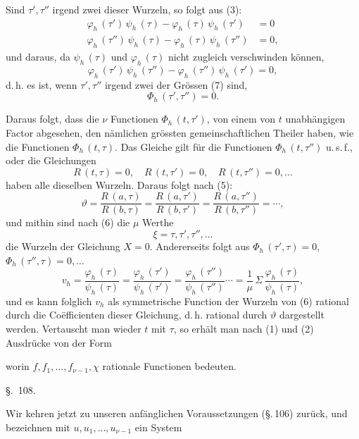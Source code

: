 Sind $\tau', \tau''$ irgend zwei dieser Wurzeln, so folgt aus (3):
\[
\begin{aligned}
\varphi_h\,(\tau')\,\psi_h\,(\tau) - \varphi_h\,(\tau)\,\psi_h\,(\tau') &= 0\\
\varphi_h\,(\tau'')\,\psi_h\,(\tau) - \varphi_h\,(\tau)\,\psi_h\,(\tau'') &= 0,
\end{aligned}
\]
und daraus, da $\psi_h\,(\tau)$ und $\varphi_h\,(\tau)$ nicht zugleich
verschwinden können,
\[
\varphi_h\,(\tau')\,\psi_h\,(\tau'') - \varphi_h\,(\tau'')\,\psi_h\,(\tau') = 0,
\]
d.\,h. es ist, wenn $\tau', \tau''$ irgend zwei der Grössen (7) sind,
\[
\Phi_h\,(\tau', \tau'') = 0.
\]

Daraus folgt, dass die $\nu$ Functionen $\Phi_h\,(t,\tau')$, von einem von
$t$ unabhängigen Factor abgesehen, den nämlichen grössten
gemeinschaftlichen Theiler haben, wie die Functionen $\Phi_h\,(t,\tau)$.
Das Gleiche gilt für die Functionen $\Phi_h\,(t,\tau'')$ u.\,s.\,f., oder
die Gleichungen
\[
R\,(t,\tau) = 0, \quad R\,(t,\tau') = 0, \quad R\,(t,\tau'') = 0, \ldots
\]
haben alle dieselben Wurzeln. Daraus folgt nach (5):
\[
\vartheta = \dfrac{R\,(a,\tau)}{R\,(b,\tau)} = \dfrac{R\,(a,\tau')}{R\,(b,\tau')} = \dfrac{R\,(a,\tau'')}{R\,(b,\tau'')} = \cdots,
\]
und mithin sind nach (6) die $\mu$ Werthe
\[
\xi = \tau, \tau', \tau'', \ldots
\]
die Wurzeln der Gleichung $X = 0$. Andererseits folgt aus
$\Phi_h\,(\tau',\tau) = 0$, $\Phi_h\,(\tau'',\tau) = 0, \ldots$
\[
v_h = \dfrac{\varphi_h\,(\tau)}{\psi_h\,(\tau)} = \dfrac{\varphi_h\,(\tau')}{\psi_h\,(\tau')} = \dfrac{\varphi_h\,(\tau'')}{\psi_h\,(\tau'')} \cdots = \dfrac{1}{\mu}\,\Sigma\,\dfrac{\varphi_h\,(\tau)}{\psi_h\,(\tau)},
\]
und es kann folglich $v_h$ als symmetrische Function der Wurzeln von (6)
rational durch die Coëfficienten dieser Gleichung, d.\,h. rational durch
$\vartheta$ dargestellt werden. Vertauscht man wieder $t$ mit $\tau$, so
erhält man nach (1) und (2) Ausdrücke von der Form


worin $f, f_1, \ldots, f_{\nu-1}, \chi$ rationale Functionen bedeuten.

\begin{center}
\S.\ 108.\\
\end{center}

Wir kehren jetzt zu unseren anfänglichen Voraussetzungen (\S.\,106)
zurück, und bezeichnen mit $u, u_1, \ldots, u_{\nu-1}$ ein System
